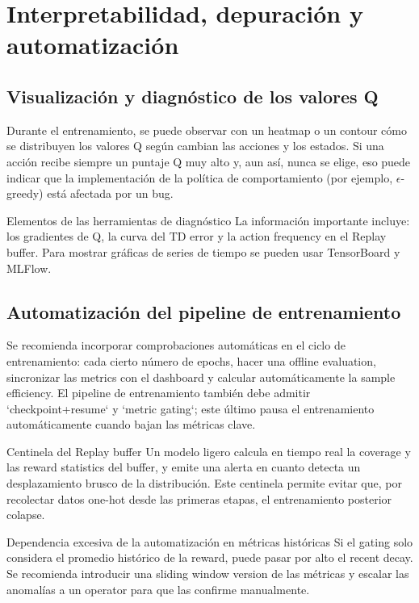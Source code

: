 \documentclass[a4paper]{article}
\begin{document}
\section{Interpretabilidad, depuración y automatización}

\subsection{Visualización y diagnóstico de los valores Q}

Durante el entrenamiento, se puede observar con un heatmap o un contour cómo se distribuyen los valores Q según cambian las acciones y los estados. Si una acción recibe siempre un puntaje Q muy alto y, aun así, nunca se elige, eso puede indicar que la implementación de la política de comportamiento (por ejemplo, $\epsilon$-greedy) está afectada por un bug.

\begin{knowledgebox}{Elementos de las herramientas de diagnóstico}
La información importante incluye: los gradientes de Q, la curva del TD error y la action frequency en el Replay buffer. Para mostrar gráficas de series de tiempo se pueden usar TensorBoard y MLFlow.
\end{knowledgebox}

\subsection{Automatización del pipeline de entrenamiento}

Se recomienda incorporar comprobaciones automáticas en el ciclo de entrenamiento: cada cierto número de epochs, hacer una offline evaluation, sincronizar las metrics con el dashboard y calcular automáticamente la sample efficiency. El pipeline de entrenamiento también debe admitir `checkpoint+resume` y `metric gating`; este último pausa el entrenamiento automáticamente cuando bajan las métricas clave.

\begin{importantbox}{Centinela del Replay buffer}
Un modelo ligero calcula en tiempo real la coverage y las reward statistics del buffer, y emite una alerta en cuanto detecta un desplazamiento brusco de la distribución. Este centinela permite evitar que, por recolectar datos one-hot desde las primeras etapas, el entrenamiento posterior colapse.
\end{importantbox}

\begin{warningbox}{Dependencia excesiva de la automatización en métricas históricas}
Si el gating solo considera el promedio histórico de la reward, puede pasar por alto el recent decay. Se recomienda introducir una sliding window version de las métricas y escalar las anomalías a un operator para que las confirme manualmente.
\end{warningbox}
\end{document}
